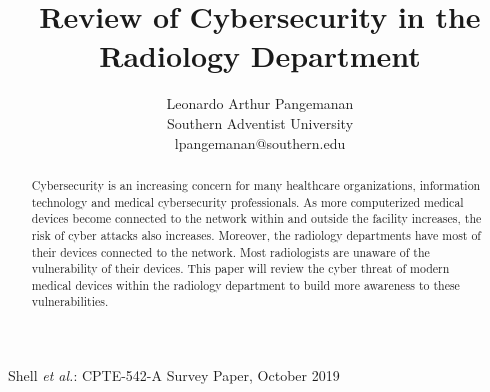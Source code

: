 \documentclass[pdf,bookmarks,colorlinks=true]{IEEEtran}
\begin{document}
%
\title{Review of Cybersecurity in the Radiology Department}


\author{Leonardo Arthur Pangemanan\\
	Southern Adventist University\\
	lpangemanan@southern.edu
}



%
{Shell \MakeLowercase{\textit{et al.}}: CPTE-542-A Survey Paper, October 2019}

\maketitle

\begin{abstract}
	Cybersecurity is an increasing concern for many healthcare organizations, information technology and medical cybersecurity professionals. As more computerized medical devices become connected to the network within and outside the facility increases, the risk of cyber attacks also increases. Moreover, the radiology departments have most of their devices connected to the network. Most radiologists are unaware of the vulnerability of their devices. This paper will review the cyber threat of modern medical devices within the radiology department to build more awareness to these vulnerabilities.
\end{abstract}
\end{document}
